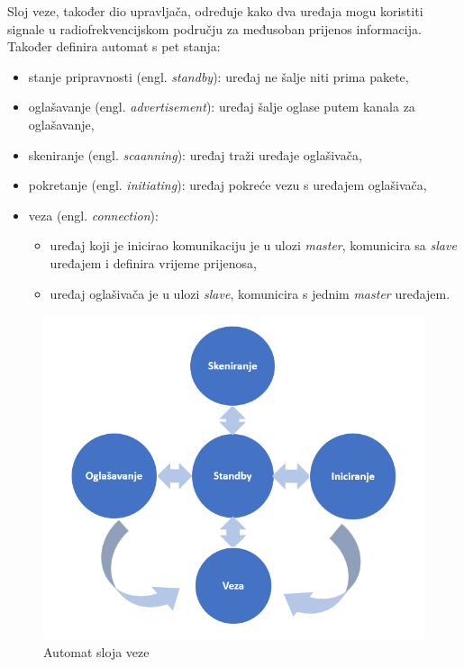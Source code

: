 Sloj veze, također dio upravljača, određuje kako dva uređaja mogu koristiti signale u radiofrekvencijskom području za međusoban prijenos informacija. Također definira automat s pet stanja:
\begin{itemize}
	\item stanje pripravnosti (engl. \textit{standby}): uređaj ne šalje niti prima pakete,
	\item oglašavanje (engl. \textit{advertisement}): uređaj šalje oglase putem kanala za oglašavanje,
	\item skeniranje (engl. \textit{scaanning}): uređaj traži uređaje oglašivača,
	\item pokretanje (engl. \textit{initiating}): uređaj pokreće vezu s uređajem oglašivača,
	\item veza (engl. \textit{connection}): 
	\begin{itemize}
		\item uređaj  koji je inicirao komunikaciju je u ulozi \textit{master}, komunicira sa  \textit{slave} uređajem i definira vrijeme prijenosa,
		\item uređaj oglašivača je u ulozi \textit{slave}, komunicira s jednim \textit{master} uređajem.
	\end{itemize}

\end{itemize}

\begin{figure}[ht]
	\centering
	\includegraphics[scale=0.7]{imgs/ll_state_machine}
	\caption{Automat sloja veze \cite{blemanual}}
	\label{fig:ll-state-machine}
\end{figure}

